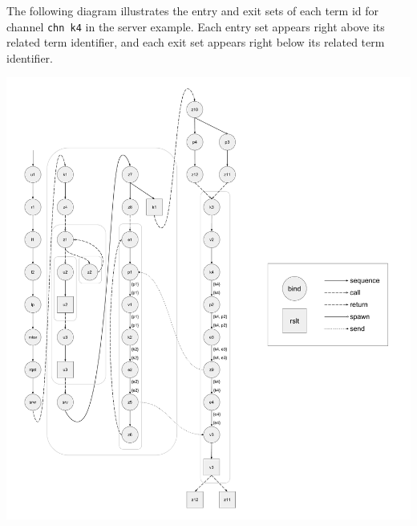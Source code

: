 \documentclass[letterpaper, 11pt]{report}
\begin{document}
The following diagram illustrates the entry and exit sets of each term id
for channel \lstinline{chn k4} in
the server example. Each entry set appears right above its related term identifier,
and each exit set appears right below its related term identifier. 

\includegraphics[width=1\textwidth]{cml-liveness-analysis-k4.pdf}
\end{document}
